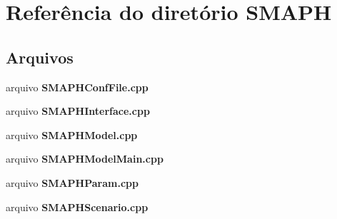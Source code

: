 \section{Referência do diretório S\+M\+A\+PH}
\label{dir_4e3315e4fac8021cb551258ab659ce20}
\subsection*{Arquivos}
\begin{DoxyCompactItemize}
\item 
arquivo {\bf S\+M\+A\+P\+H\+Conf\+File.\+cpp}
\item 
arquivo {\bf S\+M\+A\+P\+H\+Interface.\+cpp}
\item 
arquivo {\bf S\+M\+A\+P\+H\+Model.\+cpp}
\item 
arquivo {\bf S\+M\+A\+P\+H\+Model\+Main.\+cpp}
\item 
arquivo {\bf S\+M\+A\+P\+H\+Param.\+cpp}
\item 
arquivo {\bf S\+M\+A\+P\+H\+Scenario.\+cpp}
\end{DoxyCompactItemize}

